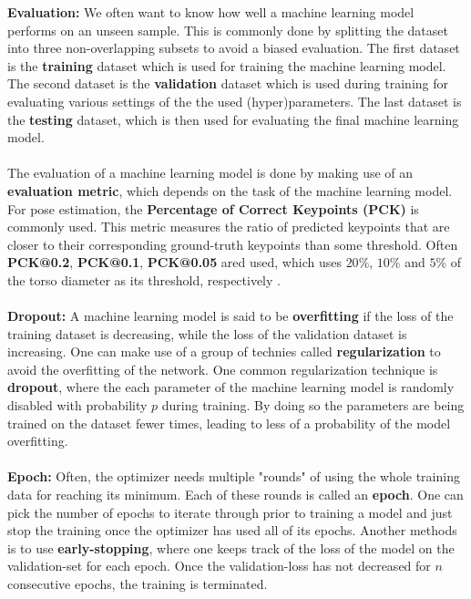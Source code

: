 \documentclass[./main.tex]{subfiles}
\begin{document}
\noindent \textbf{Evaluation:} We often want to know how well a machine learning model performs on an unseen sample. This is commonly done by splitting the dataset into three non-overlapping subsets to avoid a biased evaluation. The first dataset is the \textbf{training} dataset which is used for training the machine learning model. The second dataset is the \textbf{validation} dataset which is used during training for evaluating various settings of the the used (hyper)parameters. The last dataset is the \textbf{testing} dataset, which is then used for evaluating the final machine learning model.
\\
\\
The evaluation of a machine learning model is done by making use of an \textbf{evaluation metric}, which depends on the task of the machine learning model. For pose estimation, the \textbf{Percentage of Correct Keypoints (PCK)} is commonly used. This metric measures the ratio of predicted keypoints that are closer to their corresponding ground-truth keypoints than some threshold. Often \textbf{PCK@0.2}, \textbf{PCK@0.1}, \textbf{PCK@0.05} ared used, which uses $20\%$, $10\%$ and $5\%$ of the torso diameter as its threshold, respectively \cite{https://doi.org/10.48550/arxiv.2001.08095}.
\\
\\
\noindent \textbf{Dropout:} A machine learning model is said to be \textbf{overfitting} if the loss of the training dataset is decreasing, while the loss of the validation dataset is increasing. One can make use of a group of technies called \textbf{regularization} to avoid the overfitting of the network. One common regularization technique is \textbf{dropout}, where the each parameter of the machine learning model is randomly disabled with probability $p$ during training. By doing so the parameters are being trained on the dataset fewer times, leading to less of a probability of the model overfitting.
\\
\\
\noindent \textbf{Epoch:} Often, the optimizer needs multiple "rounds" of using the whole training data for reaching its minimum. Each of these rounds is called an \textbf{epoch}. One can pick the number of epochs to iterate through prior to training a model and just stop the training once the optimizer has used all of its epochs. Another methods is to use \textbf{early-stopping}, where one keeps track of the loss of the model on the validation-set for each epoch. Once the validation-loss has not decreased for $n$ consecutive epochs, the training is terminated.
\end{document}
